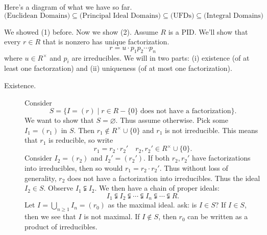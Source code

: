 \documentclass[12pt,letterpaper]{algebra_book}
\theoremstyle{definition}
\begin{document}
Here's a diagram of what we have so far. 
\[
    \text{(Euclidean Domains)} \subseteq \text{(Principal Ideal Domains)} \subseteq \text{(UFDs)} \subseteq \text{(Integral Domains)}
\]
\begin{prf}
    We showed (1) before. Now we show (2). Assume $R$ is a PID.
    We'll show that every $r \in R$ that is nonzero has unique
    factorization. 
    \[
        r = u \cdot p_1p_2 \cdots p_n
    \]
    where $u \in R^{\times}$ and $p_i$ are irreducibles. We will
    in two parts: (i) existence (of at least one factorzation) and
    (ii) uniqueness (of at most one factorization).

    \begin{description}
        \item[Existence.] Consider
        \[
            S = \{I = (r) \mid r \in R-\{0\} \text{ does not have a factorization}\}.   
        \]  
        We want to show that $S = \varnothing$. Thus assume
        otherwise. Pick some $I_1 = (r_1)$ in $S$. 
        Then $r_1 \not\in R^{\times}\cup\{0\}$ and $r_1$ is not
        irreducible. This means that $r_1$ is reducible, so write 
        \[
            r_1 = r_2 \cdot r_2' \quad r_2,r_2' \in R^{\times}\cup\{0\}.
        \]
        Consider $I_2 = (r_2)$ and $I_2' = (r_2')$. If both $r_2,
        r_2'$ have factorizations into irreducibles, then so would
        $r_1 = r_2\cdot r_2'$. Thus without loss of generality, $r_2$
        does not have a factorization into irreducibles. Thus the
        ideal $I_2 \in S$. Observe $I_1 \subsetneqq I_2$. We then have
        a chain of proper ideals:
        \[
            I_1 \subsetneqq I_2 \subsetneqq \cdots \subsetneqq I_n \subsetneqq \cdots \subsetneqq R.
        \]
        Let $\displaystyle I = \bigcup_{n \ge 1} I_n = (r_0)$ as the maximal ideal.
        ask: is $I \in S$? If  $I \in S$, then we see that $I$ is not
        maximal. If $I \not\in S$, then $r_0$ can be written as a
        product of irreducibles. 


\end{description}
\end{prf}
\end{document}
